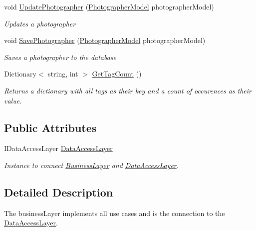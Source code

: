 \begin{DoxyCompactItemize}
void \mbox{\hyperlink{class_pic_d_b_1_1_layers_1_1_business_layer_a0475835841490a4b7b6af5e36c4d4b50}{Update\+Photographer}} (\mbox{\hyperlink{class_pic_d_b_1_1_models_1_1_photographer_model}{Photographer\+Model}} photographer\+Model)
\begin{DoxyCompactList}\small\item\em Updates a photographer \end{DoxyCompactList}\item 
void \mbox{\hyperlink{class_pic_d_b_1_1_layers_1_1_business_layer_a7e60f5c2e5cd6f328a29d463fe55c39f}{Save\+Photographer}} (\mbox{\hyperlink{class_pic_d_b_1_1_models_1_1_photographer_model}{Photographer\+Model}} photographer\+Model)
\begin{DoxyCompactList}\small\item\em Saves a photographer to the database \end{DoxyCompactList}\item 
Dictionary$<$ string, int $>$ \mbox{\hyperlink{class_pic_d_b_1_1_layers_1_1_business_layer_ac40aff11a3cf922ed150d392bda38093}{Get\+Tag\+Count}} ()
\begin{DoxyCompactList}\small\item\em Returns a dictionary with all tags as their key and a count of occurences as their value. \end{DoxyCompactList}\end{DoxyCompactItemize}
\subsection*{Public Attributes}
\begin{DoxyCompactItemize}
\item 
I\+Data\+Access\+Layer \mbox{\hyperlink{class_pic_d_b_1_1_layers_1_1_business_layer_a151abe5dd6d6a269790dac9babcd1e09}{Data\+Access\+Layer}}
\begin{DoxyCompactList}\small\item\em Instance to connect \mbox{\hyperlink{class_pic_d_b_1_1_layers_1_1_business_layer}{Business\+Layer}} and \mbox{\hyperlink{class_pic_d_b_1_1_layers_1_1_data_access_layer}{Data\+Access\+Layer}}. \end{DoxyCompactList}\end{DoxyCompactItemize}


\subsection{Detailed Description}
The business\+Layer implements all use cases and is the connection to the \mbox{\hyperlink{class_pic_d_b_1_1_layers_1_1_data_access_layer}{Data\+Access\+Layer}}. 



